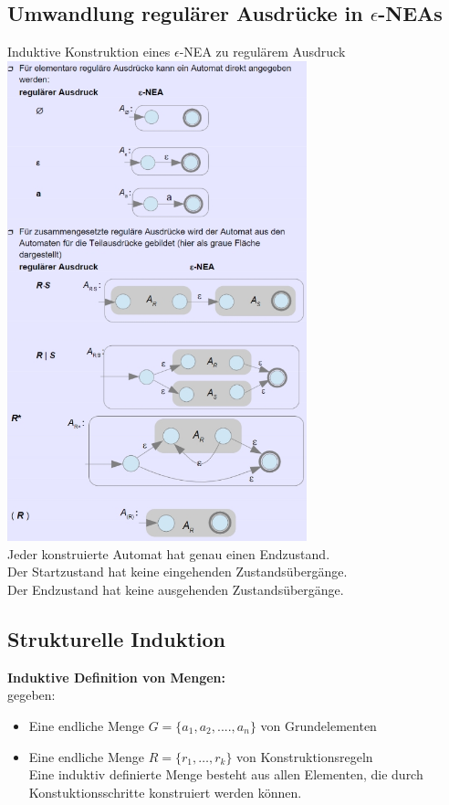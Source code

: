 \documentclass{scrreprt}
\begin{document}
\subsection{Umwandlung regulärer Ausdrücke in $\epsilon$-NEAs}
Induktive Konstruktion eines $\epsilon$-NEA zu regulärem Ausdruck
\\\includegraphics[width=0.65\textwidth]{"graphics/9-1-1"}
\\Jeder konstruierte Automat hat genau einen Endzustand.
\\Der Startzustand hat keine eingehenden Zustandsübergänge.
\\Der Endzustand hat keine ausgehenden Zustandsübergänge.
\subsection{Strukturelle Induktion}
\textbf{Induktive Definition von Mengen:}
\\gegeben:
\begin{itemize}
    \item Eine endliche Menge $G=\{a_1,a_2,....,a_n\}$ von Grundelementen
    \item Eine endliche Menge $R=\{r_1,\dots,r_k\} $ von Konstruktionsregeln
    \\Eine induktiv definierte Menge besteht aus allen Elementen, die durch Konstuktionsschritte konstruiert werden können.
\end{itemize}
\end{document}
